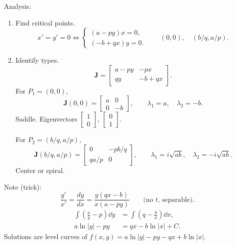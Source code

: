 Analysis:
\begin{enumerate}
  \item Find critical points.
        \[
          x'=y'=0 \iff
          \begin{cases}
            (a-py)x=0, \\(-b+qx)y=0.
          \end{cases}
          \qquad (0,0),\quad (b/q,a/p).
        \]
  \item Identify types.
        \[
          \mathbf{J}=
          \begin{bmatrix}
            a-py & -px \\qy&-b+qx
          \end{bmatrix}
          .
        \]
        For $P_1=(0,0)$,
        \[
          \mathbf{J}(0,0)=
          \begin{bmatrix}
            a & 0 \\0&-b
          \end{bmatrix}
          ,
          \qquad \lambda_1=a,\quad \lambda_2=-b.
        \]
        Saddle. Eigenvectors $
          \begin{bmatrix}
            1 \\0
          \end{bmatrix}
        $,
        $
          \begin{bmatrix}
            0 \\1
          \end{bmatrix}
        $.
        \begin{center}
        \end{center}
        For $P_2=(b/q,a/p)$,
        \[
          \mathbf{J}(b/q,a/p)=
          \begin{bmatrix}
            0 & -pb/q \\qa/p&0
          \end{bmatrix}
          ,
          \qquad \lambda_1=i\sqrt{ab},\quad \lambda_2=-i\sqrt{ab}.
        \]
        Center or spiral.
\end{enumerate}

Note (trick):
\[
  \frac{y'}{x'}=\frac{dy}{dx}=\frac{y(qx-b)}{x(a-py)}
  \qquad\text{(no $t$, separable).}
\]
\begin{align*}
  \int\left(\frac{a}{y}-p\right)\dd y
             & =\int\left(q-\frac{b}{x}\right)\dd x, \\
  a\ln|y|-py & = qx-b\ln|x|+C.
\end{align*}
Solutions are level curves of $f(x,y)=a\ln|y|-py-qx+b\ln|x|$.

